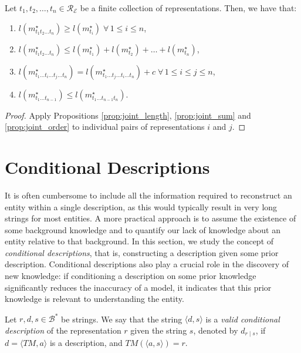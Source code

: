 \begin{proposition}
\label{prop:joint_multiple_topics}
Let $t_1, t_2, \ldots, t_n \in \mathcal{R}_\mathcal{E}$ be a finite collection of representations. Then, we have that:

\renewcommand{\theenumi}{\roman{enumi}}
\begin{enumerate}
\item $l(m_{t_1 t_2 \ldots t_n}^\star) \geq l(m_ {t_i}^\star) \; \forall \, 1 \leq i \leq n$,
\item $l(m_{t_1 t_2 \ldots t_n}^\star) \leq l(m_ {t_1}^\star) + l(m_ {t_2}^\star) + \ldots + l(m_ {t_n}^\star)$,
\item $l(m_{t_1 \ldots t_i \ldots t_j \ldots t_n}^\star) = l(m_{t_1 \ldots t_j \ldots t_i \ldots t_n}^\star) + c \; \forall \, 1 \leq i \leq j \leq n$,
\item $l(m_{t_1 \ldots t_{n-1}}^\star) \leq l(m_{t_1 \ldots t_{n-1} t_n}^\star)$.
\end{enumerate}
\end{proposition}
\begin{proof}
Apply Propositions \ref{prop:joint_length}, \ref{prop:joint_sum} and \ref{prop:joint_order} to individual pairs of representations $i$ and $j$.
\end{proof}

%
%

\section{Conditional Descriptions}

It is often cumbersome to include all the information required to reconstruct an entity within a single description, as this would typically result in very long strings for most entities. A more practical approach is to assume the existence of some background knowledge and to quantify our lack of knowledge about an entity relative to that background. In this section, we study the concept of \emph{conditional descriptions}, that is, constructing a description given some prior description. Conditional descriptions also play a crucial role in the discovery of new knowledge: if conditioning a description on some prior knowledge significantly reduces the inaccuracy of a model, it indicates that this prior knowledge is relevant to understanding the entity.

\begin{definition}
\label{def:conditional_description}
Let $r, d, s \in \mathcal{B}^\ast$ be strings. We say that the string $\langle d, s \rangle$ is a \emph{valid conditional description} of the representation $r$ given the string $s$, denoted by $d_{r \mid s}$, if $d = \langle TM, a \rangle$ is a description, and $TM \left(\langle a, s \rangle \right) = r$.
\end{definition}

